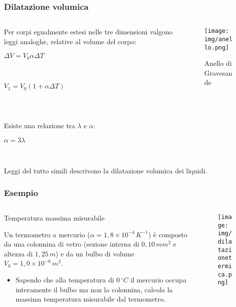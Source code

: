 \documentclass[]{beamer}
\theoremstyle{plain}
\begin{document}
\begin{frame}
\frametitle{Dilatazione volumica}
\begin{columns}
\begin{column}{0.65\textwidth}
Per corpi egualmente estesi nelle tre dimensioni valgono leggi analoghe, relative al \alert{volume del corpo}:
\begin{center}
\colorbox{blue!30}{$ \Delta V = V_0 \alpha \Delta T $}

~

\colorbox{blue!30}{$ V_1 = V_0 ( 1 + \alpha \Delta T ) $}
\end{center}
\end{column}
\begin{column}{0.25\textwidth}
\begin{figure}
\texttt{[image: img/anello.png]}

{\tiny Anello di Gravesande}\pause
\end{figure}
\end{column}
\end{columns}


~

Esiste una relazione tra $ \lambda $ e $ \alpha $:
\begin{center}
$ \alpha = 3 \lambda $
\end{center}\pause

~

Leggi del tutto simili descrivono la dilatazione volumica dei liquidi.
\end{frame}

\begin{frame}
\frametitle{Esempio}
\begin{columns}
\begin{column}{0.7\textwidth}
\begin{exampleblock}{Temperatura massima misurabile}
{\small Un termometro a mercurio ($ \alpha = 1,8 \times 10^{-4} \, K^{-1} $) è composto da una colonnina di vetro (sezione interna di $ 0,10 \, mm^2 $ e altezza di $ 1,25 \, m $) e da un bulbo di volume $ V_0 = 1,0 \times 10^{-6} \, m^3  $.
\begin{itemize}
  \item Sapendo che alla temperatura di $ 0 \, ^\circ C $ il mercurio occupa interamente il bulbo ma non la colonnina, calcola la massima temperatura misurabile dal termometro.
\end{itemize}}
\end{exampleblock}
\end{column}
\begin{column}{0.2\textwidth}
\begin{figure}
\texttt{[image: img/dilatazionetermica.png]}
\end{figure}
\end{column}
\end{columns}
\end{frame}
\end{document}
